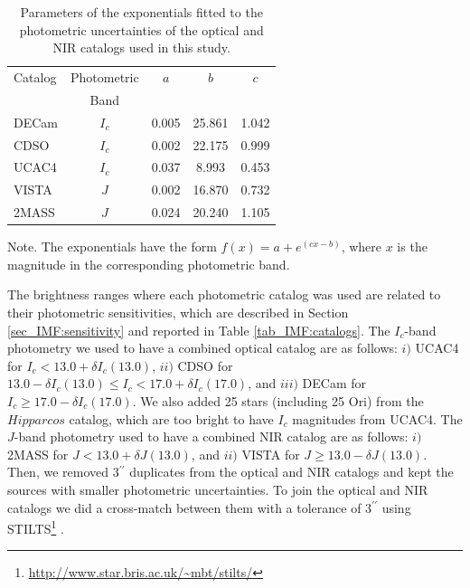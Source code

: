 \documentclass[12pt]{article}
\newcounter{subsubsubsection}[subsubsection]
\begin{document}
\begin{table}
\caption[Parameters of the exponentials fitted to the photometric errors of the optical and NIR catalogs.]{Parameters of the exponentials fitted to the photometric uncertainties of the optical and NIR catalogs used in this study.}
  \small
  \label{tab_IMF:errors}
  \setlength{\tabcolsep}{18pt}
  \begin{center}
  \begin{threeparttable}
 	\begin{tabular}{lcccc}
    \toprule
 	Catalog & Photometric &  $a$  &  $b$   & $c$   \\
			& Band        &       &        &       \\
    \midrule
 	DECam   & $I_c$	& 0.005 & 25.861 & 1.042 \\
 	CDSO    & $I_c$	& 0.002 & 22.175 & 0.999 \\
 	UCAC4   & $I_c$	& 0.037 & 8.993  & 0.453 \\
 	VISTA   & $J$	& 0.002 & 16.870 & 0.732 \\
 	2MASS   & $J$	& 0.024 & 20.240 & 1.105 \\
    \bottomrule
 	\end{tabular}
  \begin{tablenotes}
	Note. The exponentials have the form $f(x)=a+e^{(cx-b)}$, where $x$ is the magnitude in the corresponding photometric band.
  \end{tablenotes}
 \end{threeparttable}
 \end{center}
\end{table}

\label{sec_IMF:cutoffs}
The brightness ranges where each photometric catalog was used are related to their photometric sensitivities, which are described in Section \ref{sec_IMF:sensitivity} and reported in Table \ref{tab_IMF:catalogs}. The $I_c$-band photometry we used to have a combined optical catalog are as follows: $i)$ UCAC4 for $I_c<13.0+\delta I_c(13.0)$, $ii)$ CDSO for $13.0-\delta I_c(13.0)\leq I_c<17.0+\delta I_c(17.0)$, and $iii)$ DECam for $I_c\geq 17.0-\delta I_c(17.0)$. We also added 25 stars (including 25 Ori) from the $Hipparcos$ catalog, which are too bright to have $I_c$ magnitudes from UCAC4. The $J$-band photometry used to have a combined NIR catalog are as follows: $i)$ 2MASS for $J<13.0+\delta J(13.0)$, and $ii)$ VISTA for $J\geq 13.0-\delta J(13.0)$. Then, we removed 3$^{\prime\prime}$ duplicates from the optical and NIR catalogs and kept the sources with smaller photometric uncertainties. To join the optical and NIR catalogs we did a cross-match between them with a tolerance of 3$^{\prime\prime}$ using STILTS\footnote{\url{http://www.star.bris.ac.uk/~mbt/stilts/}} \citep{Taylor2006}.
\end{document}
